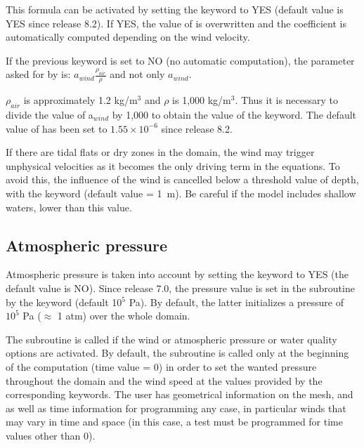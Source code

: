 This formula can be activated by setting the keyword
 to YES
(default value is YES since release 8.2).
If YES, the value of  is overwritten and
the coefficient is automatically computed depending on the wind velocity.

If the previous keyword is set to NO (no automatic computation), the parameter
 asked for by  is:
$a_{wind} \frac{\rho_{air}}{\rho}$ and not only $a_{wind}$.

$\rho_{air}$ is approximately 1.2 kg/m$^3$ and $\rho$ is 1,000 kg/m$^3$.
Thus it is necessary to divide the value of a$_{wind}$ by 1,000
to obtain the value of the  keyword.
The default value of  has been set to
$1.55 \times 10^{-6}$ since release 8.2.

If there are tidal flats or dry zones in the domain, the wind may trigger
unphysical velocities as it becomes the only driving term in the equations.
To avoid this, the influence of the wind is cancelled below a threshold value
of depth, with the keyword 
(default value = 1~m).
Be careful if the model includes shallow waters, lower than this value.

\subsection{Atmospheric pressure}

Atmospheric pressure is taken into account by setting the keyword
 to YES (the default value is NO).
Since release 7.0, the pressure value is set in the 
subroutine by the keyword 
(default 10$^5$ Pa).
By default, the latter initializes a pressure of $10^5$ Pa ($\approx$ 1 atm)
over the whole domain.

The  subroutine is called if the wind or atmospheric pressure
or water quality options are activated.
By default, the subroutine is called only at the beginning of the computation
(time value = 0) in order to set the wanted pressure throughout the domain
and the wind speed at the values provided by the corresponding keywords.
The user has geometrical information on the mesh, and as well as time
information for programming any case, in particular winds that may vary in time
and space (in this case, a test must be programmed for time values other than 0).

